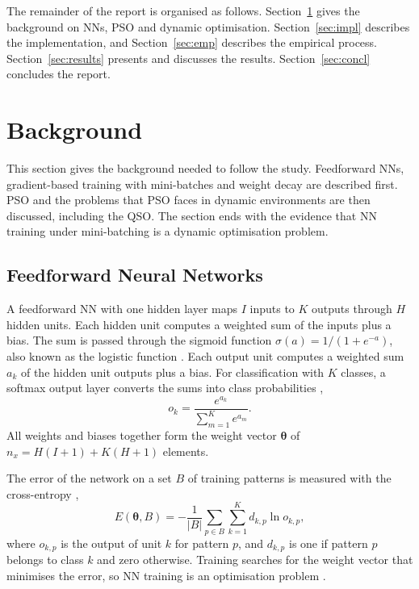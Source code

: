 \documentclass[conference]{IEEEtran}
\begin{document}
The remainder of the report is organised as follows.
Section~\ref{sec:background} gives the background on NNs, PSO and
dynamic optimisation. Section~\ref{sec:impl} describes the
implementation, and Section~\ref{sec:emp} describes the empirical
process. Section~\ref{sec:results} presents and discusses the results.
Section~\ref{sec:concl} concludes the report.

\section{Background}
\label{sec:background}
This section gives the background needed to follow the study.
Feedforward NNs, gradient-based training with mini-batches and weight
decay are described first. PSO and the problems that PSO faces in
dynamic environments are then discussed, including the QSO. The
section ends with the evidence that NN training under mini-batching
is a dynamic optimisation problem.

\subsection{Feedforward Neural Networks}
A feedforward NN with one hidden layer maps $I$ inputs to $K$
outputs through $H$ hidden units. Each hidden unit computes a
weighted sum of the inputs plus a bias. The sum is passed through the
sigmoid function $\sigma(a) = 1/(1 + e^{-a})$, also known as the
logistic function \cite{kelleher2015}. Each output unit
computes a weighted sum $a_k$ of the hidden unit outputs plus a bias.
For classification with $K$ classes, a softmax output layer converts
the sums into class probabilities \cite{dennis2021},
\begin{equation}
o_k = \frac{e^{a_k}}{\sum_{m=1}^{K} e^{a_m}}.
\end{equation}
All weights and biases together form the weight vector
$\boldsymbol{\theta}$ of $n_x = H(I+1) + K(H+1)$ elements.

The error of the network on a set $B$ of training patterns is measured
with the cross-entropy \cite{dennis2021},
\begin{equation}
E(\boldsymbol{\theta}, B) = -\frac{1}{|B|} \sum_{p \in B}
\sum_{k=1}^{K} d_{k,p} \ln o_{k,p},
\label{eq:ce}
\end{equation}
where $o_{k,p}$ is the output of unit $k$ for pattern $p$, and
$d_{k,p}$ is one if pattern $p$ belongs to class $k$ and zero
otherwise. Training searches for the weight vector that minimises the
error, so NN training is an optimisation problem
\cite{engelbrecht2007}.
\end{document}
